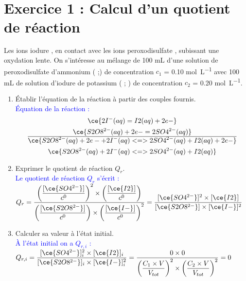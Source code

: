 \documentclass[a4paper,11pt,fleqn]{article}%
\begin{document}
	\maketitle
\section*{Exercice 1 : Calcul d'un quotient de réaction}
Les ions iodure , en contact avec les ions peroxodisulfate , subissant une oxydation lente. On s'intéresse au mélange de \num{100} \unit{\milli \liter} d'une solution de peroxodisulfate d'ammonium ( ;) de concentration $c_1$ = \num{0,10} \unit{\mole \per \liter} avec \num{100} \unit{\milli \liter} de solution d'iodure de potassium ( ; ) de concentration $c_2$ = \num{0,20} \unit{\mole \per \liter}.
\begin{enumerate}
	\item Établir l'équation de la réaction à partir des couples fournis.\\
	\textcolor{blue}{Équation de la réaction :
	\begin{gather*}
	\ce{ 2 I^{-}(aq) = I2(aq) + 2 e-} \\
	\ce{S2O8^{2-}(aq) + 2 e- = 2 SO4^{2-}(aq) }\\
	\hline
	\ce{S2O8^{2-}(aq) + 2 e- + 2 I^{-}(aq) <=> 2 SO4^{2-}(aq) + I2(aq) + 2 e-} \\
	\ce{S2O8^{2-}(aq) + 2 I^{-}(aq) <=> 2 SO4^{2-}(aq) + I2(aq)}
	\end{gather*}}
	\item Exprimer le quotient de réaction $Q_r$.\\
	\textcolor{blue}{Le quotient de réaction $Q_r$ s'écrit :\\
	$Q_r = \dfrac{\left(\dfrac{[\ce{SO4^{2-}}]}{c^0}\right)^2 \times \left(\dfrac{[\ce{I2}]}{c^0}\right)}{\left(\dfrac{[\ce{S2O8^{2-}}]}{c^0}\right) \times \left(\dfrac{[\ce{I-}]}{c^0}\right)^2} = \dfrac{[\ce{SO4^{2-}}]^2 \times [\ce{I2}]}{[\ce{S2O8^{2-}}] \times [\ce{I-}]^2}$}
	\item Calculer sa valeur à l'état initial.\\
	\textcolor{blue}{À l'état initial on a $Q_{r,i}$ :\\
	$Q_{r,i} = \dfrac{[\ce{SO4^{2-}}]_i^2 \times [\ce{I2}]_i}{[\ce{S2O8^{2-}}]_i \times [\ce{I-}]_i^2} = \dfrac{0 \times 0}{\left(\dfrac{C_1 \times V}{V_{tot}}\right)^2 \times\left(\dfrac{C_2 \times V}{V_{tot}}\right)^2} = 0$  }
\end{enumerate}
\end{document}
